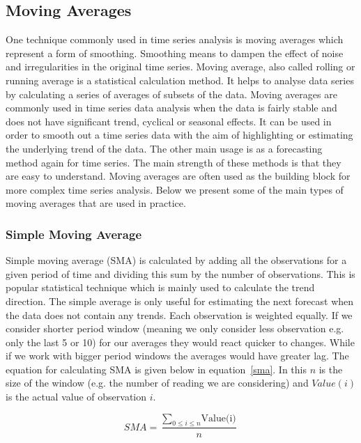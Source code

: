 \subsection{Moving Averages}
One technique commonly used in time series analysis is moving averages which represent a form of smoothing. Smoothing means to dampen the effect of noise and irregularities in the original time series. Moving average, also called rolling or running average is a statistical calculation method. It helps to analyse data series by calculating a series of averages of subsets of the data. Moving averages are commonly used in time series data analysis when the data is fairly stable and does not have significant trend, cyclical or seasonal effects. It can be used in order to smooth out a time series data with the aim of highlighting or estimating the underlying trend of the data. The other main usage is as a forecasting method again for time series. The main strength of these methods is that they are easy to understand.  Moving averages are often used as the building block for more complex time series analysis. Below we present some of the main types of moving averages that are used in practice. \cite{brockwell2009time,shumway2010time}

\subsubsection{Simple Moving Average}
Simple moving average (SMA) is calculated by adding all the observations for a given period of time and dividing this sum by the number of observations. This is popular statistical technique which is mainly used to calculate the trend direction. The simple average is only useful for estimating the next forecast when the data does not contain any trends. Each observation is weighted equally. If we consider shorter period window (meaning we only consider less observation e.g. only the last 5 or 10) for our averages they would react quicker to changes. While if we work with bigger period windows the averages would have greater lag. The equation for calculating SMA is given below in equation~\ref{sma}. In this $n$ is the size of the window (e.g. the number of reading we are considering) and $Value(i)$ is the actual value of observation $i$. 

\begin{equation}\label{sma}
	SMA = \frac{\sum_{0\le i\le n}\textrm{Value(i)}}{n}
\end{equation}

